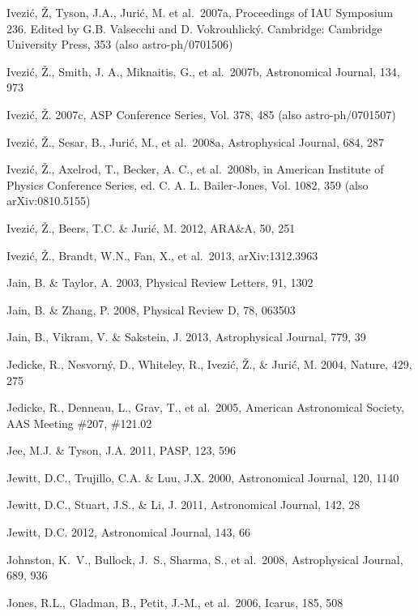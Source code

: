 \documentclass{emulateapj}
\begin{document}
\begin{thebibliography}{}
\bibitem[()]{} Ivezi\'{c}, \v{Z}, Tyson, J.A., Juri\'{c}, M. et al.~2007a, Proceedings of IAU Symposium 
             236. Edited by G.B. Valsecchi and D. Vokrouhlick\'{y}. Cambridge: Cambridge University 
             Press, 353 (also astro-ph/0701506)

\bibitem[()]{} Ivezi\'{c}, \v{Z}., Smith, J. A., Miknaitis, G., et al.~2007b, Astronomical Journal, 134, 973

\bibitem[()]{} Ivezi\'{c}, \v{Z}. 2007c, ASP Conference Series, Vol. 378, 485 (also astro-ph/0701507)

\bibitem[()]{} Ivezi\'c, \v Z., Sesar, B., Juri\'{c}, M., et al.~2008a, Astrophysical Journal, 684, 287

\bibitem[()]{} Ivezi\'c, \v Z., Axelrod, T., Becker, A. C., et al.~2008b, in American Institute of
                           Physics Conference Series, ed. C. A. L. Bailer-Jones, Vol. 1082, 359 (also arXiv:0810.5155)

\bibitem[()]{} Ivezi\'c, \v Z., Beers, T.C. \& Juri\'{c}, M. 2012, ARA\&A, 50, 251

\bibitem[()]{} Ivezi\'c, \v Z., Brandt, W.N., Fan, X., et al.~2013, arXiv:1312.3963

\bibitem[()]{} Jain, B. \& Taylor, A. 2003, Physical Review Letters, 91, 1302	

\bibitem[()]{} Jain, B. \& Zhang, P. 2008, Physical Review D, 78, 063503 
 
\bibitem[()]{} Jain, B., Vikram, V. \& Sakstein, J. 2013, Astrophysical Journal, 779, 39

\bibitem[()]{} Jedicke, R., Nesvorn{\'y}, D., Whiteley, R., Ivezi{\'c}, {\v Z}., \& Juri{\'c}, M. 2004, 
             Nature, 429, 275 

\bibitem[()]{} Jedicke, R., Denneau, L., Grav, T., et al.~2005, American Astronomical Society, AAS 
             Meeting \#207, \#121.02

\bibitem[()]{} Jee, M.J. \& Tyson, J.A. 2011, PASP, 123, 596

\bibitem[()]{} Jewitt, D.C., Trujillo, C.A. \& Luu, J.X. 2000, Astronomical Journal, 120, 1140

\bibitem[()]{} Jewitt, D.C., Stuart, J.S., \& Li, J. 2011, Astronomical Journal, 142, 28 

\bibitem[()]{} Jewitt, D.C. 2012, Astronomical Journal, 143, 66

\bibitem[()]{} Johnston, K.~V., Bullock, J.~S., Sharma, S., et al.~2008, Astrophysical Journal, 689, 936

\bibitem[()]{} Jones, R.L., Gladman, B., Petit, J.-M., et al.~2006, Icarus, 185, 508


\end{thebibliography}
\end{document}
